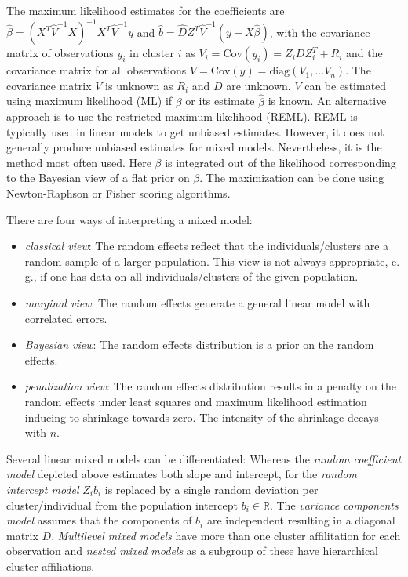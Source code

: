 \documentclass[12pt]{article}
\begin{document}
The maximum likelihood estimates for the coefficients are $\hat{\beta} = (X^T \hat{V}^{-1} X)^{-1} X^T \hat{V}^{-1}y$ and $\hat{b} = \hat{D}Z^T\hat{V}^{-1} (y-X\hat{\beta})$, with the covariance matrix of observations $y_i$ in cluster $i$ as $V_i = \mathrm{Cov}(y_i) = Z_iDZ_i^T + R_i$ and the covariance matrix for all observations $V = \mathrm{Cov}(y) = \mathrm{diag}(V_1,...V_n)$.
The covariance matrix $V$ is unknown as $R_i$ and $D$ are unknown. $V$ can be estimated  using maximum likelihood (ML) if $\beta$ or its estimate $\hat{\beta}$ is known. An alternative approach is to use the restricted  maximum likelihood  (REML). REML is typically used in linear models to get unbiased estimates. However, it does not generally produce unbiased estimates for mixed models. Nevertheless, it is the method most often used. Here $\beta$ is integrated out of the likelihood corresponding to the Bayesian view of a flat prior on $\beta$. The maximization can be done using Newton-Raphson or Fisher scoring algorithms. 

There are four ways of interpreting a mixed model:
\begin{itemize}
\item \textit{classical view}: The random effects reflect that the individuals/clusters are a random sample of a larger population. This view is not always appropriate, e.\,g., if one has data on all individuals/clusters of the given population.
\item \textit{marginal view}: The random effects generate a general linear
model with correlated errors.
\item \textit{Bayesian view}: The random effects distribution is a prior on the random effects.
\item \textit{penalization view}: The random effects distribution results in a penalty on the random effects under least squares and maximum likelihood estimation inducing to shrinkage towards zero. The intensity of the shrinkage decays with $n$.
\end{itemize}


Several linear mixed models can be differentiated:
Whereas the \textit{random coefficient model} depicted above estimates both slope and intercept, for the \textit{random intercept model} $Z_ib_i$ is replaced by a single random deviation per cluster/individual from the population intercept $b_i \in \mathbb{R}$. The \textit{variance components model} assumes that the components of $b_i$ are independent resulting in a diagonal matrix $D$.
\textit{Multilevel mixed models} have more than one cluster affilitation for each observation and \textit{nested mixed models} as a subgroup of these have hierarchical cluster affiliations.
\end{document}

